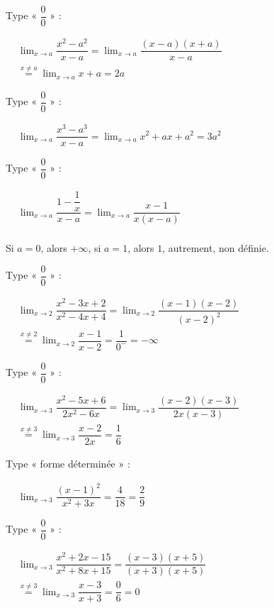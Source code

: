 {\begin{tasks}
\task Type « $\dfrac{0}{0}$ » :

\( \begin{aligned}
&\lim_{x \to a} \dfrac{x^2 - a^2}{x - a} = \lim_{x \to a} \dfrac{(x - a)(x + a)}{x - a} \\
&\stackrel{x \ne a}{=} \lim_{x \to a} x + a = 2a
\end{aligned} \)

\task Type « $\dfrac{0}{0}$ » :

\( \begin{aligned}
&\lim_{x \to a} \dfrac{x^3 - a^3}{x - a} = \lim_{x \to a} x^2 + ax + a^2 = 3a^2
\end{aligned} \)

\task Type « $\dfrac{0}{0}$ » :

\( \begin{aligned}
&\lim_{x \to a} \dfrac{1 - \dfrac{1}{x}}{x - a} = \lim_{x \to a} \dfrac{x - 1}{x(x - a)} \\
\end{aligned} \)

Si $a=0$, alors $+\infty$, si $a=1$, alors $1$, autrement, non définie. 

\task Type « $\dfrac{0}{0}$ » :

\( \begin{aligned}
&\lim_{x \to 2} \dfrac{x^2 - 3x + 2}{x^2 - 4x + 4} = \lim_{x \to 2} \dfrac{(x - 1)(x - 2)}{(x - 2)^2} \\
&\stackrel{x \ne 2}{=} \lim_{x \to 2} \dfrac{x - 1}{x - 2} = \dfrac{1}{0^-} = -\infty
\end{aligned} \)

\task Type « $\dfrac{0}{0}$ » :

\( \begin{aligned}
&\lim_{x \to 3} \dfrac{x^2 - 5x + 6}{2x^2 - 6x} = \lim_{x \to 3} \dfrac{(x - 2)(x - 3)}{2x(x - 3)} \\
&\stackrel{x \ne 3}{=} \lim_{x \to 3} \dfrac{x - 2}{2x} = \dfrac{1}{6}
\end{aligned} \)

\task Type « forme déterminée » :

\( \begin{aligned}
&\lim_{x \to 3} \dfrac{(x - 1)^2}{x^2 + 3x} = \dfrac{4}{18} = \dfrac{2}{9}
\end{aligned} \)

\task Type « $\dfrac{0}{0}$ » :

\( \begin{aligned}
&\lim_{x \to 3} \dfrac{x^2 + 2x - 15}{x^2 + 8x + 15} = \dfrac{(x - 3)(x + 5)}{(x + 3)(x + 5)} \\
&\stackrel{x \ne 3}{=} \lim_{x \to 3} \dfrac{x - 3}{x + 3} = \dfrac{0}{6} = 0
\end{aligned} \)


\end{tasks}}
